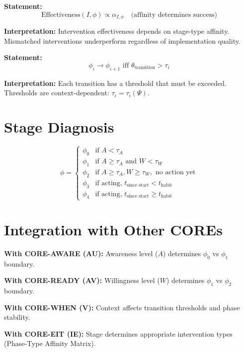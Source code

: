 \begin{tcolorbox}[colback=gray!5!white, colframe=gray!75!black,
    title=Axiom BCJ-3: Stage-Intervention Match]
\textbf{Statement:}
\begin{equation}
\text{Effectiveness}(I, \phi) \propto \alpha_{I,\phi} \quad \text{(affinity determines success)}
\end{equation}

\textbf{Interpretation:} Intervention effectiveness depends on stage-type affinity.
Mismatched interventions underperform regardless of implementation quality.
\end{tcolorbox}

\begin{tcolorbox}[colback=gray!5!white, colframe=gray!75!black,
    title=Axiom BCJ-4: Transition Thresholds]
\textbf{Statement:}
\begin{equation}
\phi_i \to \phi_{i+1} \text{ iff } \theta_{\text{transition}} > \tau_i
\end{equation}

\textbf{Interpretation:} Each transition has a threshold that must be exceeded.
Thresholds are context-dependent: $\tau_i = \tau_i(\Psi)$.
\end{tcolorbox}

\section{Stage Diagnosis}
\label{sec:stage-diagnosis}

\begin{equation}
\phi = \begin{cases}
\phi_0 & \text{if } A < \tau_A \\
\phi_1 & \text{if } A \geq \tau_A \text{ and } W < \tau_W \\
\phi_2 & \text{if } A \geq \tau_A, W \geq \tau_W, \text{ no action yet} \\
\phi_3 & \text{if acting, } t_{\text{since start}} < t_{\text{habit}} \\
\phi_4 & \text{if acting, } t_{\text{since start}} \geq t_{\text{habit}}
\end{cases}
\end{equation}

\section{Integration with Other COREs}

\begin{tcolorbox}[colback=yellow!5!white, colframe=yellow!75!black,
    title=Integration: CORE-STAGE $\leftrightarrow$ Other COREs]
\textbf{With CORE-AWARE (AU):}
Awareness level ($A$) determines $\phi_0$ vs $\phi_1$ boundary.

\textbf{With CORE-READY (AV):}
Willingness level ($W$) determines $\phi_1$ vs $\phi_2$ boundary.

\textbf{With CORE-WHEN (V):}
Context affects transition thresholds and phase stability.

\textbf{With CORE-EIT (IE):}
Stage determines appropriate intervention types (Phase-Type Affinity Matrix).
\end{tcolorbox}

